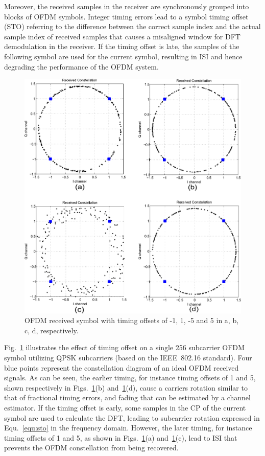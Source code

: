 Moreover, the received samples in the receiver are synchronously grouped into blocks of OFDM symbols.
Integer timing errors lead to a symbol timing offset (STO) referring to the difference between the correct sample index and the actual sample index of received samples that causes a misaligned window for DFT demodulation in the receiver.
If the timing offset is late, the samples of the following symbol are used for the current symbol, resulting in ISI and hence degrading the performance of the OFDM system.
\begin{figure}
	\centerline{\includegraphics [width=0.8\columnwidth] {Figures/timeoff.pdf} }
	\caption{OFDM received symbol with timing offsets of -1, 1, -5 and 5 in a, b, c, d, respectively.}
	\label{fig:Timingoffsetconstellation}
\end{figure}

Fig.~\ref{fig:Timingoffsetconstellation} illustrates the effect of timing offset on a single 256 subcarrier OFDM symbol utilizing QPSK subcarriers (based on the IEEE~802.16 standard).
Four blue points represent the constellation diagram of an ideal OFDM received signals.
As can be seen, the earlier timing, for instance timing offsets of 1 and 5, shown respectively in Figs.~\ref{fig:Timingoffsetconstellation}(b) and~\ref{fig:Timingoffsetconstellation}(d), cause a carriers rotation similar to that of fractional timing errors, and fading that can be estimated by a channel estimator.
If the timing offset is early, some samples in the CP of the current symbol are used to calculate the DFT, leading to subcarrier rotation expressed in Equ.~\ref{equ:sto} in the frequency domain.
However, the later timing, for instance timing offsets of 1 and 5, as shown in Figs.~\ref{fig:Timingoffsetconstellation}(a) and~\ref{fig:Timingoffsetconstellation}(c), lead to ISI that prevents the OFDM constellation from being recovered.

